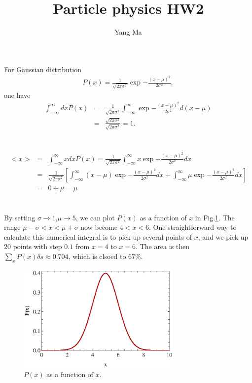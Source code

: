 \documentclass[11pt]{article}
\begin{document}
\title{Particle physics HW2}
\author{Yang Ma}

\maketitle


\section{ }
For Gaussian distribution
\begin{eqnarray}
  P(x)=\frac{1}{\sqrt{2 \pi \sigma^2}}\exp{-\frac{(x-\mu)^2}{2\sigma^2}},
\end{eqnarray}
one have
\begin{eqnarray}
  \int_{-\infty}^{\infty} d x P(x) &=& \frac{1}{\sqrt{2 \pi \sigma^2}} \int_{-\infty}^{\infty} \exp{-\frac{(x-\mu)^2}{2\sigma^2}} d (x-\mu)\nonumber \\
  &=&\frac{\sqrt{2 \pi \sigma^2}}{\sqrt{2 \pi \sigma^2}} =1.
\end{eqnarray}

\section{ }
\begin{eqnarray}
  <x> &=&\int_{-\infty}^{\infty} x d x P(x) = \frac{1}{\sqrt{2 \pi \sigma^2}} \int_{-\infty}^{\infty} x \exp{-\frac{(x-\mu)^2}{2\sigma^2}} dx \nonumber \\
  &=& \frac{1}{\sqrt{2 \pi \sigma^2}} \left [ \int_{-\infty}^{\infty} (x-\mu) \exp{-\frac{(x-\mu)^2}{2\sigma^2}} dx +  \int_{-\infty}^{\infty} \mu \exp{-\frac{(x-\mu)^2}{2\sigma^2}} dx \right ] \nonumber \\
  &=& 0+ \mu =\mu
\end{eqnarray}

\section{ }
By setting $\sigma\to1$,$\mu \to 5$, we can plot $P(x)$ as a function of $x$ in Fig.\ref{fig.2_3}. The range $\mu -\sigma < x < \mu +\sigma$ now become $4 < x < 6$. One straightforward way to calculate this numerical integral is to pick up several points of $x$, and we pick up 20 points with step $0.1$ from $x=4$ to $x=6$. The area is then $\sum_x P(x) \delta s\approx 0.704$, which is clsoed to $67\%$.
\begin{figure}[htb]
  \centering
  \includegraphics[width=8cm]{2_3.eps}
  \caption{$P(x)$ as a function of $x$.\label{fig.2_3}}
\end{figure}
\end{document}
